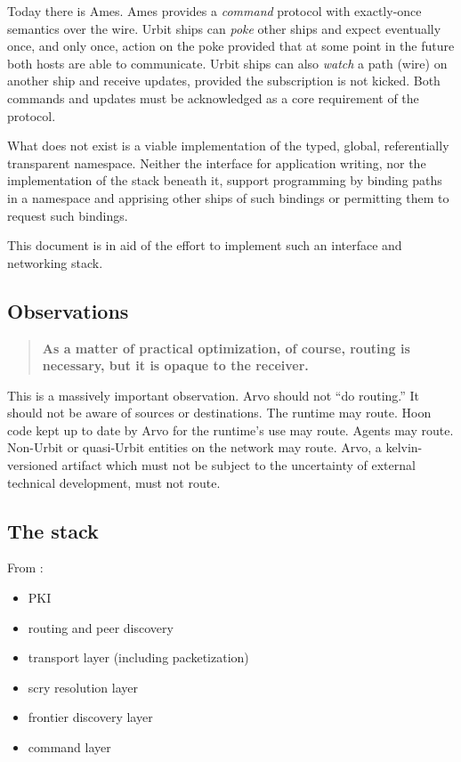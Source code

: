 Today there is Ames. Ames provides a \emph{command} protocol with
exactly-once semantics over the wire. Urbit ships can \emph{poke} other
ships and expect eventually once, and only once, action on the poke
provided that at some point in the future both hosts are able to
communicate. Urbit ships can also \emph{watch} a path (wire) on another
ship and receive updates, provided the subscription is not kicked. Both
commands and updates must be acknowledged as a core requirement of the
protocol.

What does not exist is a viable implementation of the typed, global,
referentially transparent namespace. Neither the interface for
application writing, nor the implementation of the stack beneath it,
support programming by binding paths in a namespace and apprising other
ships of such bindings or permitting them to request such bindings.

This document is in aid of the effort to implement such an interface and
networking stack.

\subsection{Observations}

\begin{quote}
\textbf{As a matter of practical optimization, of course, routing is
necessary, but it is opaque to the receiver.}
\end{quote}
\cite{Yarvin2010}

This is a massively important observation. Arvo should not ``do
routing.'' It should not be aware of sources or destinations. The
runtime may route. Hoon code kept up to date by Arvo for the runtime's
use may route. Agents may route. Non-Urbit or quasi-Urbit entities on
the network may route. Arvo, a kelvin-versioned artifact which must not
be subject to the uncertainty of external technical development, must
not route.

\subsection{The stack}

From :

\begin{itemize}
\item PKI
\item routing and peer discovery
\item transport layer (including packetization)
\item scry resolution layer
\item frontier discovery layer
\item command layer
\end{itemize}

